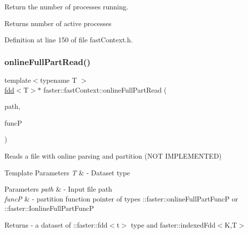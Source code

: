 Return the number of processes running. 

\begin{DoxyReturn}{Returns}
number of active processes 
\end{DoxyReturn}


Definition at line 150 of file fast\+Context.\+h.

\hypertarget{classfaster_1_1fastContext_acb65e4cdd0eaae3bf4326247b822e025}{}\label{classfaster_1_1fastContext_acb65e4cdd0eaae3bf4326247b822e025} 
\subsubsection{\texorpdfstring{online\+Full\+Part\+Read()}{onlineFullPartRead()}}
{\footnotesize\ttfamily template$<$typename T $>$ \\
\hyperlink{classfaster_1_1fdd}{fdd}$<$T$>$$\ast$ faster\+::fast\+Context\+::online\+Full\+Part\+Read (\begin{DoxyParamCaption}\item[{std\+::string}]{path,  }\item[{online\+Full\+Part\+FuncP$<$ T $>$}]{funcP }\end{DoxyParamCaption})}



Reads a file with online parsing and partition (N\+OT I\+M\+P\+L\+E\+M\+E\+N\+T\+ED) 


\begin{DoxyTemplParams}{Template Parameters}
{\em T} & -\/ Dataset type \\
\hline
\end{DoxyTemplParams}

\begin{DoxyParams}{Parameters}
{\em path} & -\/ Input file path \\
\hline
{\em funcP} & -\/ partition function pointer of types \+::faster\+::online\+Full\+Part\+FuncP or \+::faster\+::\+Ionline\+Full\+Part\+FuncP\\
\hline
\end{DoxyParams}
\begin{DoxyReturn}{Returns}
-\/ a dataset of \+::faster\+::fdd$<$t$>$ type and faster\+::indexed\+Fdd$<$\+K,\+T$>$ 
\end{DoxyReturn}
\hypertarget{classfaster_1_1fastContext_a8cf960425a7671021854367ea9649546}{}\label{classfaster_1_1fastContext_a8cf960425a7671021854367ea9649546} 
